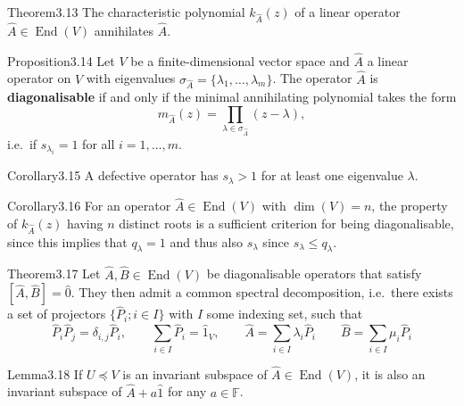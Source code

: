 \begin{res}{Theorem}{3.13}
The characteristic polynomial $k_{\hat A}(z)$ of a linear operator $\hat A\in\operatorname{End}(V)$ annihilates $\hat A$.
\end{res}

\begin{res}{Proposition}{3.14}
Let $V$ be a finite-dimensional vector space and $\hat A$ a linear operator on $V$ with eigenvalues $\sigma_{\hat A}=\{\lambda_1,\dots,\lambda_m\}$. The operator $\hat A$ is \textbf{diagonalisable} if and only if the minimal annihilating polynomial takes the form
\begin{equation}m_{\hat A}(z)=\prod_{\lambda\in\sigma_{\hat A}}(z-\lambda),\tag{3.27}\end{equation}
i.e.\ if $s_{\lambda_i}=1$ for all $i=1,\dots,m$.
\end{res}

\begin{res}{Corollary}{3.15}
A defective operator has $s_\lambda>1$ for at least one eigenvalue $\lambda$.
\end{res}

\begin{res}{Corollary}{3.16}
For an operator $\hat A\in\operatorname{End}(V)$ with $\dim(V)=n$, the property of $k_{\hat A}(z)$ having $n$ distinct roots is a sufficient criterion for being diagonalisable, since this implies that $q_\lambda=1$ and thus also $s_\lambda$ since $s_\lambda\le q_\lambda$.
\end{res}

\begin{res}{Theorem}{3.17}
Let $\hat A,\hat B\in\operatorname{End}(V)$ be diagonalisable operators that satisfy $[\hat A,\hat B]=\hat 0$. They then admit a common spectral decomposition, i.e.\ there exists a set of projectors $\{\hat P_i;i\in I\}$ with $I$ some indexing set, such that
\begin{equation}\hat P_i\hat P_j=\delta_{i,j}\hat P_i,\qquad\sum_{i\in I}\hat P_i=\hat 1_V,\qquad\hat A=\sum_{i\in I}\lambda_i\hat P_i\qquad\hat B=\sum_{i\in I}\mu_i\hat P_i\tag{3.33}\end{equation}
\end{res}

\begin{res}{Lemma}{3.18}
If $U\preccurlyeq V$ is an invariant subspace of $\hat A\in\operatorname{End}(V)$, it is also an invariant subspace of $\hat A+a\hat 1$ for any $a\in\mathbb F$.
\end{res}

